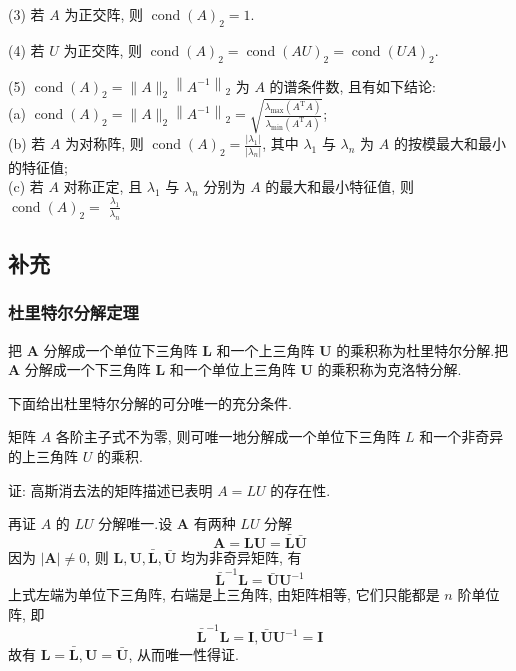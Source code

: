 (3) 若 $ A $ 为正交阵, 则 $ \operatorname{cond}(A)_{2}=1 $.

(4) 若 $ U $ 为正交阵, 则 $ \operatorname{cond}(A)_{2}=\operatorname{cond}(A U)_{2}=\operatorname{cond}(U A)_{2} $.

(5) $ \operatorname{cond}(A)_{2}=\|A\|_{2}\left\|A^{-1}\right\|_{2} $ 为 $ A $ 的谱条件数, 且有如下结论:\\
(a) $ \operatorname{cond}(A)_{2}=\|A\|_{2}\left\|A^{-1}\right\|_{2}=\sqrt{\frac{\lambda_{\max }\left(A^{\mathrm{T}} A\right)}{\lambda_{\min }\left(A^{\mathrm{T}} A\right)}} $;\\
(b) 若 $ A $ 为对称阵, 则 $ \operatorname{cond}(A)_{2}=\frac{\left|\lambda_{1}\right|}{\left|\lambda_{n}\right|} $, 其中 $ \lambda_{1} $ 与 $ \lambda_{n} $ 为 $ A $ 的按模最大和最小的特征值;\\
(c) 若 $ A $ 对称正定, 且 $ \lambda_{1} $ 与 $ \lambda_{n} $ 分别为 $ A $ 的最大和最小特征值, 则 $ \operatorname{cond}(A)_{2}= $ $ \frac{\lambda_{1}}{\lambda_{n}} $

\subsection{补充}
\subsubsection{杜里特尔分解定理}
把 $ \boldsymbol{A} $ 分解成一个单位下三角阵 $ \boldsymbol{L} $ 和一个上三角阵 $ \boldsymbol{U} $ 的乘积称为杜里特尔分解.把 $ \boldsymbol{A} $ 分解成一个下三角阵 $ \boldsymbol{L} $ 和一个单位上三角阵 $ \boldsymbol{U} $ 的乘积称为克洛特分解.

下面给出杜里特尔分解的可分唯一的充分条件.

\begin{tcolorbox}[enhanced,colback=2,colframe=1,breakable,coltitle=black,title=$LU$分解定理]
 矩阵 $ A $ 各阶主子式不为零, 则可唯一地分解成一个单位下三角阵 $ L $ 和一个非奇异的上三角阵 $ U $ 的乘积.
 \end{tcolorbox}
证: 高斯消去法的矩阵描述已表明 $ A=L U $ 的存在性.

再证 $ A $ 的 ${LU} $ 分解唯一.设 $ \boldsymbol{A} $ 有两种 $ {LU} $ 分解
$$
\boldsymbol{A}=\boldsymbol{L} \boldsymbol{U}=\bar{\boldsymbol{L}} \bar{\boldsymbol{U}}
$$
因为 $ |\boldsymbol{A}| \neq 0 $, 则 $ \boldsymbol{L}, \boldsymbol{U}, \bar{\boldsymbol{L}}, \bar{\boldsymbol{U}} $ 均为非奇异矩阵, 有
$$
\bar{\boldsymbol{L}}^{-1} \boldsymbol{L}=\bar{\boldsymbol{U}} \boldsymbol{U}^{-1}
$$
上式左端为单位下三角阵, 右端是上三角阵, 由矩阵相等, 它们只能都是 $ n $ 阶单位阵, 即
$$
\bar{\boldsymbol{L}}^{-1} \boldsymbol{L}=\boldsymbol{I}, \bar{\boldsymbol{U}} \boldsymbol{U}^{-1}=\boldsymbol{I}
$$
故有 $ \boldsymbol{L}=\bar{\boldsymbol{L}}, \boldsymbol{U}=\bar{\boldsymbol{U}} $, 从而唯一性得证.

